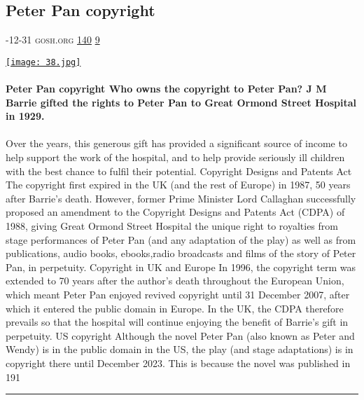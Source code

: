 \documentclass[10pt,a4paper]{article}
\begin{document}
\begin{multicols}{2}
\begin{minipage}{\linewidth}
\subsection{Peter Pan copyright}
\textsc{\footnotesize
{\scriptsize\faCalendar}-12-31 
{\scriptsize\faGlobe}\space 
gosh.org 
{\scriptsize\faThumbsOUp}\space 
\href{http://news.ycombinator.com/item?id=37128929\&utm\_term=comment}{140} 
{\scriptsize\faComments}\space 
\href{http://news.ycombinator.com/item?id=37128929\&utm\_term=comment}{9} 
}
\par\medskip\noindent
\href{https://www.gosh.org/about-us/peter-pan/copyright/?utm\_source=hackernewsletter\&utm\_medium=email\&utm\_term=books}{
    \texttt{[image: 38.jpg]}
}
\end{minipage}
\paragraph{}
\textbf{Peter Pan copyright
Who owns the copyright to Peter Pan?
J M Barrie gifted the rights to Peter Pan to Great Ormond Street Hospital in 1929.}
\paragraph{}
 Over the years, this generous gift has provided a significant source of income to help support the work of the hospital, and to help provide seriously ill children with the best chance to fulfil their potential.
Copyright Designs and Patents Act
The copyright first expired in the UK (and the rest of Europe) in 1987, 50 years after Barrie’s death.
However, former Prime Minister Lord Callaghan successfully proposed an amendment to the Copyright Designs and Patents Act (CDPA) of 1988, giving Great Ormond Street Hospital the unique right to royalties from stage performances of Peter Pan (and any adaptation of the play) as well as from publications, audio books, ebooks,radio broadcasts and films of the story of Peter Pan, in perpetuity.
Copyright in UK and Europe
In 1996, the copyright term was extended to 70 years after the author’s death throughout the European Union, which meant Peter Pan enjoyed revived copyright until 31 December 2007, after which it entered the public domain in Europe.
In the UK, the CDPA therefore prevails so that the hospital will continue enjoying the benefit of Barrie’s gift in perpetuity.
US copyright
Although the novel Peter Pan (also known as Peter and Wendy) is in the public domain in the US, the play (and stage adaptations) is in copyright there until December 2023.
This is because the novel was published in 191
\par\noindent\textcolor{red}{\rule{\linewidth}{0.2mm}}
\vfill
\null
\noindent\begin{minipage}{\linewidth}

\end{minipage}
\end{multicols}
\end{document}
